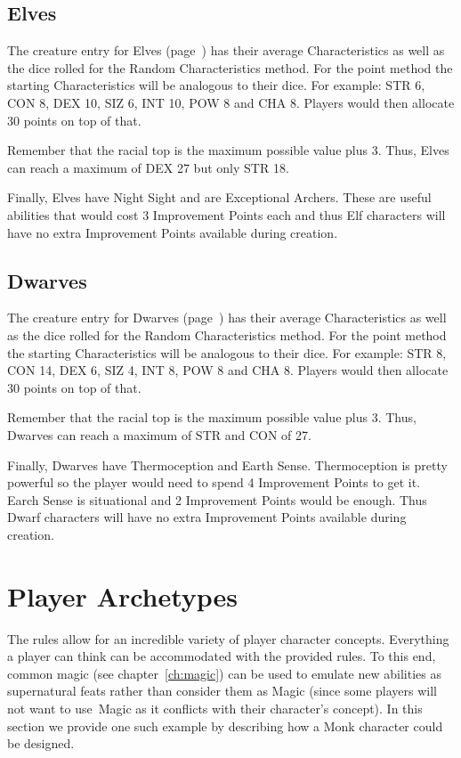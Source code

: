 \subsection{Elves}
The creature entry for Elves (page~\pageref{creature:elf}) has their average Characteristics as well as the dice rolled for the Random Characteristics method. For the point method the starting Characteristics will be analogous to their dice. For example: STR 6, CON 8, DEX 10, SIZ 6, INT 10, POW 8 and CHA 8. Players would then allocate 30 points on top of that.

Remember that the racial top is the maximum possible value plus 3. Thus, Elves can reach a maximum of DEX 27 but only STR 18.

Finally, Elves have Night Sight and are Exceptional Archers. These are useful abilities that would cost 3 Improvement Points each and thus Elf characters will have no extra Improvement Points available during creation.

\subsection{Dwarves}
The creature entry for Dwarves (page~\pageref{creature:dwarf}) has their average Characteristics as well as the dice rolled for the Random Characteristics method. For the point method the starting Characteristics will be analogous to their dice. For example: STR 8, CON 14, DEX 6, SIZ 4, INT 8, POW 8 and CHA 8. Players would then allocate 30 points on top of that.

Remember that the racial top is the maximum possible value plus 3. Thus, Dwarves can reach a maximum of STR and CON of 27.

Finally, Dwarves have Thermoception and Earth Sense. Thermoception is pretty powerful so the player would need to spend 4 Improvement Points to get it. Earch Sense is situational and 2 Improvement Points would be enough. Thus Dwarf characters will have no extra Improvement Points available during creation.



\section{Player Archetypes}

The rules allow for an incredible variety of player character concepts. Everything a player can think can be accommodated with the provided rules. To this end, common magic (see chapter~\ref{ch:magic}) can be used to emulate new abilities as supernatural feats rather than consider them as Magic (since some players will not want to use Magic as it conflicts with their character's concept). In this section we provide one such example by describing how a Monk character could be designed.

